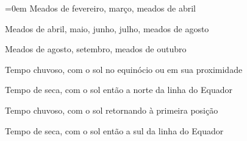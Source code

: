 %
\medskip

\begin{paracol}{2}\parindent=0em
\footnotesize
Meados de fevereiro, março, meados de abril\medskip

Meados de abril, maio, junho, julho, meados de agosto\medskip

Meados de agosto, setembro, meados de outubro\medskip

 \switchcolumn
Tempo chuvoso, com o sol no equinócio ou em sua proximidade\medskip

Tempo de seca, com o sol então a norte da linha do Equador\medskip

Tempo chuvoso, com o sol retornando à primeira posição\medskip

Tempo de seca, com o sol então a sul da linha do Equador
\end{paracol}

